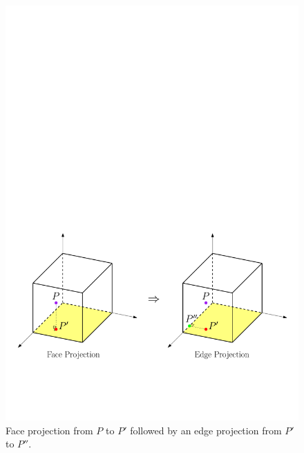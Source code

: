 \begin{figure}[!ht]
\begin{center}
\includegraphics[scale=0.6]{./figures/HexaProjection.pdf}
\caption{Face projection from $P$ to $P'$ followed by an edge projection from $P'$ to $P''$.}
\label{fig:HexaProjection}
\end{center}
\end{figure}



